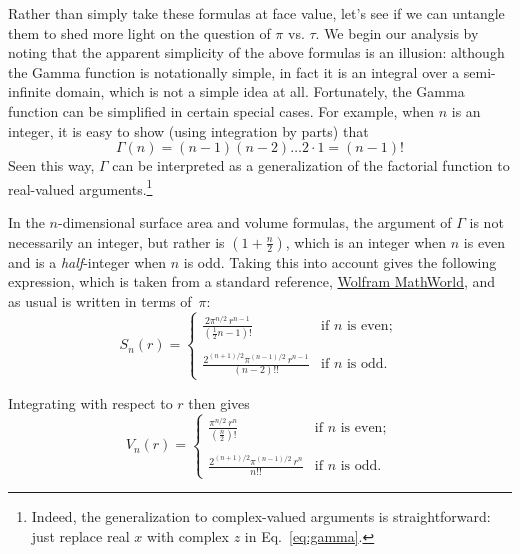 Rather than simply take these formulas at face value, let's see if we can untangle them to shed more light on the question of $\pi$ vs. $\tau$. We begin our analysis by noting that the apparent simplicity of the above formulas is an illusion: although the Gamma function is notationally simple, in fact it is an integral over a semi-infinite domain, which is not a simple idea at all. Fortunately, the Gamma function can be simplified in certain special cases. For example, when $n$ is an integer, it is easy to show (using integration by parts) that
\[
\Gamma(n) = (n-1)(n-2)\ldots 2\cdot 1 = (n-1)!
\]
Seen this way, $\Gamma$ can be interpreted as a generalization of the factorial function to real-valued arguments.\footnote{Indeed, the generalization to complex-valued arguments is straightforward: just replace real $x$ with complex $z$ in Eq.~\eqref{eq:gamma}.}

In the $n$-dimensional surface area and volume formulas, the argument of $\Gamma$ is not necessarily an integer, but rather is $\left(1 + \frac{n}{2}\right)$, which is an integer when $n$ is even and is a \emph{half}-integer when $n$ is odd. Taking this into account gives the following expression, which is taken from a standard reference, \href{http://mathworld.wolfram.com/Hypersphere.html}{Wolfram MathWorld}, and as usual is written in terms of~$\pi$:
\begin{equation}
\label{eq:surface_area_mathworld}
S_n(r) = \begin{cases}
\displaystyle \frac{2\pi^{n/2}\,r^{n-1}}{(\frac{1}{2}n - 1)!} & \text{if } n \text{ is even}; \\ \\
 \displaystyle \frac{2^{(n+1)/2}\pi^{(n-1)/2}\,r^{n-1}}{(n-2)!!} & \text{if } n \text{ is odd}.
\end{cases}
\end{equation}

Integrating with respect to $r$ then gives
\begin{equation}
\label{eq:volume_mathworld}
V_n(r) = \begin{cases}
\displaystyle \frac{\pi^{n/2}\,r^n}{(\frac{n}{2})!} & \text{if } n \text{ is even}; \\ \\
\displaystyle \frac{2^{(n+1)/2}\pi^{(n-1)/2}\,r^n}{n!!} & \text{if } n \text{ is odd}.
\end{cases}
\end{equation}

